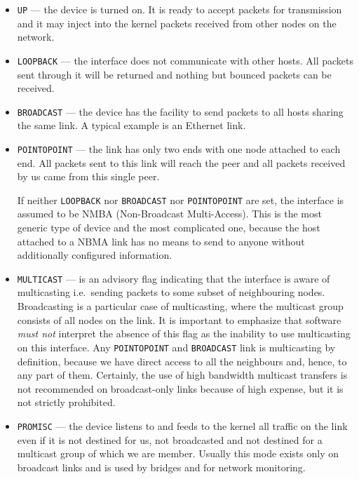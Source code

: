 \begin{itemize}
\item \verb|UP| --- the device is turned on. It is ready to accept
packets for transmission and it may inject into the kernel packets received
from other nodes on the network.

\item \verb|LOOPBACK| --- the interface does not communicate with other
hosts. All packets sent through it will be returned
and nothing but bounced packets can be received.

\item \verb|BROADCAST| --- the device has the facility to send packets
to all hosts sharing the same link. A typical example is an Ethernet link.

\item \verb|POINTOPOINT| --- the link has only two ends with one node
attached to each end. All packets sent to this link will reach the peer
and all packets received by us came from this single peer.

If neither \verb|LOOPBACK| nor \verb|BROADCAST| nor \verb|POINTOPOINT|
are set, the interface is assumed to be NMBA (Non-Broadcast Multi-Access).
This is the most generic type of device and the most complicated one, because
the host attached to a NBMA link has no means to send to anyone
without additionally configured information.

\item \verb|MULTICAST| --- is an advisory flag indicating that the interface
is aware of multicasting i.e.\ sending packets to some subset of neighbouring
nodes. Broadcasting is a particular case of multicasting, where the multicast
group consists of all nodes on the link. It is important to emphasize
that software {\em must not\/} interpret the absence of this flag as the inability
to use multicasting on this interface. Any \verb|POINTOPOINT| and
\verb|BROADCAST| link is multicasting by definition, because we have
direct access to all the neighbours and, hence, to any part of them.
Certainly, the use of high bandwidth multicast transfers is not recommended
on broadcast-only links because of high expense, but it is not strictly
prohibited.

\item \verb|PROMISC| --- the device listens to and feeds to the kernel all
traffic on the link even if it is not destined for us, not broadcasted
and not destined for a multicast group of which we are member. Usually
this mode exists only on broadcast links and is used by bridges and for network
monitoring.


\end{itemize}
